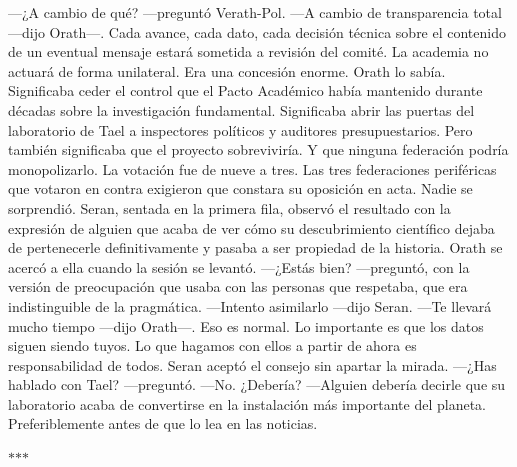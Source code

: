 \documentclass[11pt,a5paper,twoside]{book}
\begin{document}
—¿A cambio de qué? —preguntó Verath-Pol.
—A cambio de transparencia total —dijo Orath—. Cada avance, cada dato, cada decisión técnica sobre el contenido de un eventual mensaje estará sometida a revisión del comité. La academia no actuará de forma unilateral.
Era una concesión enorme. Orath lo sabía. Significaba ceder el control que el Pacto Académico había mantenido durante décadas sobre la investigación fundamental. Significaba abrir las puertas del laboratorio de Tael a inspectores políticos y auditores presupuestarios.
Pero también significaba que el proyecto sobreviviría. Y que ninguna federación podría monopolizarlo.
La votación fue de nueve a tres. Las tres federaciones periféricas que votaron en contra exigieron que constara su oposición en acta. Nadie se sorprendió.
Seran, sentada en la primera fila, observó el resultado con la expresión de alguien que acaba de ver cómo su descubrimiento científico dejaba de pertenecerle definitivamente y pasaba a ser propiedad de la historia.
Orath se acercó a ella cuando la sesión se levantó.
—¿Estás bien? —preguntó, con la versión de preocupación que usaba con las personas que respetaba, que era indistinguible de la pragmática.
—Intento asimilarlo —dijo Seran.
—Te llevará mucho tiempo —dijo Orath—. Eso es normal. Lo importante es que los datos siguen siendo tuyos. Lo que hagamos con ellos a partir de ahora es responsabilidad de todos.
Seran aceptó el consejo sin apartar la mirada.
—¿Has hablado con Tael? —preguntó.
—No. ¿Debería?
—Alguien debería decirle que su laboratorio acaba de convertirse en la instalación más importante del planeta. Preferiblemente antes de que lo lea en las noticias.
\vspace{1.5em}
\begin{center}$\ast$\quad$\ast$\quad$\ast$\end{center}
\vspace{1.5em}
\end{document}
